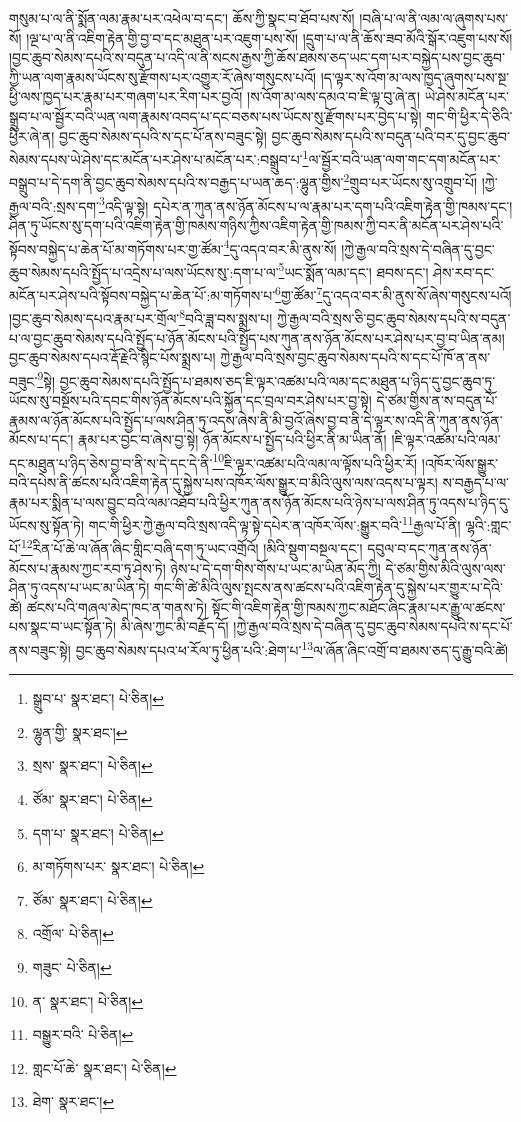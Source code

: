 གསུམ་པ་ལ་ནི་སྨོན་ལམ་རྣམ་པར་འཕེལ་བ་དང་། ཆོས་ཀྱི་སྣང་བ་ཐོབ་པས་སོ། །བཞི་པ་ལ་ནི་ལམ་ལ་ཞུགས་པས་སོ། །ལྔ་པ་ལ་ནི་འཇིག་རྟེན་གྱི་བྱ་བ་དང་མཐུན་པར་འཇུག་པས་སོ། །དྲུག་པ་ལ་ནི་ཆོས་ཟབ་མོའི་སྒོར་འཇུག་པས་སོ། །བྱང་ཆུབ་སེམས་དཔའི་ས་བདུན་པ་འདི་ལ་ནི་སངས་རྒྱས་ཀྱི་ཆོས་ཐམས་ཅད་ཡང་དག་པར་བསྐྱེད་པས་བྱང་ཆུབ་ཀྱི་ཡན་ལག་རྣམས་ཡོངས་སུ་རྫོགས་པར་འགྱུར་རོ་ཞེས་གསུངས་པའོ། །ད་ལྟར་ས་འོག་མ་ལས་ཁྱད་ཞུགས་པས་སྔ་ཕྱི་ལས་ཁྱད་པར་རྣམ་པར་གཞག་པར་རིག་པར་བྱའོ། །ས་འོག་མ་ལས་དམའ་བ་ཇི་ལྟ་བུ་ཞེ་ན། ཡེ་ཤེས་མངོན་པར་སྒྲུབ་པ་ལ་སྦྱོར་བའི་ཡན་ལག་རྣམས་འབད་པ་དང་བཅས་པས་ཡོངས་སུ་རྫོགས་པར་བྱེད་པ་སྟེ། གང་གི་ཕྱིར་དེ་ཅིའི་ཕྱིར་ཞེ་ན། བྱང་ཆུབ་སེམས་དཔའི་ས་དང་པོ་ནས་བཟུང་སྟེ། བྱང་ཆུབ་སེམས་དཔའི་ས་བདུན་པའི་བར་དུ་བྱང་ཆུབ་སེམས་དཔས་ཡེ་ཤེས་དང་མངོན་པར་ཤེས་པ་མངོན་པར་:བསྒྲུབ་པ་\footnote{སྒྲུབ་པ་  སྣར་ཐང་།  པེ་ཅིན། }ལ་སྦྱོར་བའི་ཡན་ལག་གང་དག་མངོན་པར་བསྒྲུབ་པ་དེ་དག་ནི་བྱང་ཆུབ་སེམས་དཔའི་ས་བརྒྱད་པ་ཡན་ཆད་:ལྷུན་གྱིས་\footnote{ལྷུན་གྱི་  སྣར་ཐང་། }གྲུབ་པར་ཡོངས་སུ་འགྲུབ་པོ། །ཀྱེ་རྒྱལ་བའི་:སྲས་དག་\footnote{སྲས་  སྣར་ཐང་།  པེ་ཅིན། }འདི་ལྟ་སྟེ། དཔེར་ན་ཀུན་ནས་ཉོན་མོངས་པ་ལ་རྣམ་པར་དག་པའི་འཇིག་རྟེན་གྱི་ཁམས་དང་། ཤིན་ཏུ་ཡོངས་སུ་དག་པའི་འཇིག་རྟེན་གྱི་ཁམས་གཉིས་ཀྱིས་འཇིག་རྟེན་གྱི་ཁམས་ཀྱི་བར་ནི་མངོན་པར་ཤེས་པའི་སྟོབས་བསྐྱེད་པ་ཆེན་པོ་མ་གཏོགས་པར་གྱ་ཚོམ་\footnote{ཙོམ་  སྣར་ཐང་།  པེ་ཅིན། }དུ་འདའ་བར་མི་ནུས་སོ། །ཀྱེ་རྒྱལ་བའི་སྲས་དེ་བཞིན་དུ་བྱང་ཆུབ་སེམས་དཔའི་སྤྱོད་པ་འདྲེས་པ་ལས་ཡོངས་སུ་:དག་པ་ལ་\footnote{དག་པ་  སྣར་ཐང་།  པེ་ཅིན། }ཡང་སྨོན་ལམ་དང་། ཐབས་དང་། ཤེས་རབ་དང་མངོན་པར་ཤེས་པའི་སྟོབས་བསྐྱེད་པ་ཆེན་པོ་:མ་གཏོགས་པ་\footnote{མ་གཏོགས་པར་  སྣར་ཐང་།  པེ་ཅིན། }གྱ་ཚོམ་\footnote{ཙོམ་  སྣར་ཐང་།  པེ་ཅིན། }དུ་འདའ་བར་མི་ནུས་སོ་ཞེས་གསུངས་པའོ། །བྱང་ཆུབ་སེམས་དཔའ་རྣམ་པར་གྲོལ་\footnote{འགྲོལ་  པེ་ཅིན། }བའི་ཟླ་བས་སྨྲས་པ། ཀྱེ་རྒྱལ་བའི་སྲས་ཅི་བྱང་ཆུབ་སེམས་དཔའི་ས་བདུན་པ་ལ་བྱང་ཆུབ་སེམས་དཔའི་སྤྱོད་པ་ཉོན་མོངས་པའི་སྤྱོད་པས་ཀུན་ནས་ཉོན་མོངས་པར་ཤེས་པར་བྱ་བ་ཡིན་ནམ། བྱང་ཆུབ་སེམས་དཔའ་རྡོ་རྗེའི་སྙིང་པོས་སྨྲས་པ། ཀྱེ་རྒྱལ་བའི་སྲས་བྱང་ཆུབ་སེམས་དཔའི་ས་དང་པོ་ཁོ་ན་ནས་བཟུང་\footnote{གཟུང་  པེ་ཅིན། }སྟེ། བྱང་ཆུབ་སེམས་དཔའི་སྤྱོད་པ་ཐམས་ཅད་ཇི་ལྟར་འཚམ་པའི་ལམ་དང་མཐུན་པ་ཉིད་དུ་བྱང་ཆུབ་ཏུ་ཡོངས་སུ་བསྔོས་པའི་དབང་གིས་ཉོན་མོངས་པའི་སྐྱོན་དང་བྲལ་བར་ཤེས་པར་བྱ་སྟེ། དེ་ཙམ་གྱིས་ན་ས་བདུན་པོ་རྣམས་ལ་ཉོན་མོངས་པའི་སྤྱོད་པ་ལས་ཤིན་ཏུ་འདས་ཞེས་ནི་མི་བྱའོ་ཞེས་བྱ་བ་ནི་དེ་ལྟར་ས་འདི་ནི་ཀུན་ནས་ཉོན་མོངས་པ་དང་། རྣམ་པར་བྱང་བ་ཞེས་བྱ་སྟེ། ཉོན་མོངས་པ་སྤྱོད་པའི་ཕྱིར་ནི་མ་ཡིན་ནོ། །ཇི་ལྟར་འཚམ་པའི་ལམ་དང་མཐུན་པ་ཉིད་ཅེས་བྱ་བ་ནི་ས་དེ་དང་དེ་ནི་\footnote{ན་  སྣར་ཐང་།  པེ་ཅིན། }ཇི་ལྟར་འཚམ་པའི་ལམ་ལ་ལྟོས་པའི་ཕྱིར་རོ། །འཁོར་ལོས་སྒྱུར་བའི་དཔེས་ནི་ཚངས་པའི་འཇིག་རྟེན་དུ་སྐྱེས་པས་འཁོར་ལོས་སྒྱུར་བ་མིའི་ལུས་ལས་འདས་པ་ལྟར། ས་བརྒྱད་པ་ལ་རྣམ་པར་སྨིན་པ་ལས་བྱུང་བའི་ལམ་འཐོབ་པའི་ཕྱིར་ཀུན་ནས་ཉོན་མོངས་པའི་ཉེས་པ་ལས་ཤིན་ཏུ་འདས་པ་ཉིད་དུ་ཡོངས་སུ་སྟོན་ཏེ། གང་གི་ཕྱིར་ཀྱེ་རྒྱལ་བའི་སྲས་འདི་ལྟ་སྟེ་དཔེར་ན་འཁོར་ལོས་:སྒྱུར་བའི་\footnote{བསྒྱུར་བའི་  པེ་ཅིན། }རྒྱལ་པོ་ནི། ལྷའི་:གླང་པོ་\footnote{གླང་པོ་ཆེ་  སྣར་ཐང་།  པེ་ཅིན། }རིན་པོ་ཆེ་ལ་ཞོན་ཞིང་གླིང་བཞི་དག་ཏུ་ཡང་འགྲོའོ། །མིའི་སྡུག་བསྔལ་དང་། དབུལ་བ་དང་ཀུན་ནས་ཉོན་མོངས་པ་རྣམས་ཀྱང་རབ་ཏུ་ཤེས་ཏེ། ཉེས་པ་དེ་དག་གིས་གོས་པ་ཡང་མ་ཡིན་མོད་ཀྱི། དེ་ཙམ་གྱིས་མིའི་ལུས་ལས་ཤིན་ཏུ་འདས་པ་ཡང་མ་ཡིན་ཏེ། གང་གི་ཚེ་མིའི་ལུས་སྤངས་ནས་ཚངས་པའི་འཇིག་རྟེན་དུ་སྐྱེས་པར་གྱུར་པ་དེའི་ཚེ། ཚངས་པའི་གཞལ་མེད་ཁང་ན་གནས་ཏེ། སྟོང་གི་འཇིག་རྟེན་གྱི་ཁམས་ཀྱང་མཐོང་ཞིང་རྣམ་པར་རྒྱུ་ལ་ཚངས་པས་སྣང་བ་ཡང་སྟོན་ཏེ། མི་ཞེས་ཀྱང་མི་བརྗོད་དོ། །ཀྱེ་རྒྱལ་བའི་སྲས་དེ་བཞིན་དུ་བྱང་ཆུབ་སེམས་དཔའི་ས་དང་པོ་ནས་བཟུང་སྟེ། བྱང་ཆུབ་སེམས་དཔའ་ཕ་རོལ་ཏུ་ཕྱིན་པའི་:ཐེག་པ་\footnote{ཐེག་  སྣར་ཐང་། }ལ་ཞོན་ཞིང་འགྲོ་བ་ཐམས་ཅད་དུ་རྒྱུ་བའི་ཚེ། 